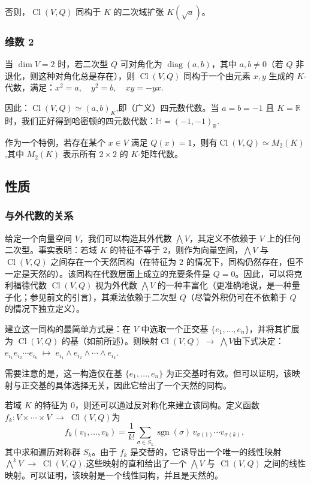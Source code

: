否则，$\operatorname{Cl}(V, Q)$ 同构于 $K$ 的二次域扩张 $K(\sqrt{a})$。
\subsubsection{维数 2}
当 $\dim V = 2$ 时，若二次型 $Q$ 可对角化为 $\operatorname{diag}(a, b)$，其中 $a, b \neq 0$（若 $Q$ 非退化，则这种对角化总是存在），则 $\operatorname{Cl}(V, Q)$ 同构于一个由元素 $x, y$ 生成的 $K$-代数，满足：$x^2 = a, \quad y^2 = b, \quad xy = - yx$.

因此：$\operatorname{Cl}(V, Q) \simeq (a, b)_K$,即（广义）四元数代数。当 $a = b = -1$ 且 $K = \mathbb{R}$ 时，我们正好得到哈密顿的四元数代数：$\mathbb{H} = (-1, -1)_{\mathbb{R}}$.

作为一个特例，若存在某个 $x \in V$ 满足 $Q(x) = 1$，则有$\operatorname{Cl}(V, Q) \simeq M_2(K)$,其中 $M_2(K)$ 表示所有 $2 \times 2$ 的 $K$-矩阵代数。
\subsection{性质}
\subsubsection{与外代数的关系}
给定一个向量空间 $V$，我们可以构造其外代数 $\bigwedge V$，其定义不依赖于 $V$ 上的任何二次型。事实表明：若域 $K$ 的特征不等于 2，则作为向量空间，$\bigwedge V$ 与 $\operatorname{Cl}(V, Q)$ 之间存在一个天然同构（在特征为 2 的情况下，同构仍然存在，但不一定是天然的）。该同构在代数层面上成立的充要条件是 $Q = 0$。因此，可以将克利福德代数 $\operatorname{Cl}(V, Q)$ 视为外代数 $\bigwedge V$ 的一种丰富化（更准确地说，是一种量子化；参见前文的引言），其乘法依赖于二次型 $Q$（尽管外积仍可在不依赖于 $Q$ 的情况下独立定义）。

建立这一同构的最简单方式是：在 $V$ 中选取一个正交基 $\{e_1, \ldots, e_n\}$，并将其扩展为 $\operatorname{Cl}(V, Q)$ 的基（如前所述）。则映射$\operatorname{Cl}(V, Q) \;\longrightarrow\; \bigwedge V$由下式决定：$e_{i_1} e_{i_2} \cdots e_{i_k} \;\mapsto\; e_{i_1} \wedge e_{i_2} \wedge \cdots \wedge e_{i_k}$.

需要注意的是，这一构造仅在基 $\{e_1, \ldots, e_n\}$ 为正交基时有效。但可以证明，该映射与正交基的具体选择无关，因此它给出了一个天然的同构。

若域 $K$ 的特征为 $0$，则还可以通过反对称化来建立该同构。定义函数$f_k : V \times \cdots \times V \;\longrightarrow\; \operatorname{Cl}(V, Q)$为
$$
f_k(v_1, \ldots, v_k) = \frac{1}{k!} \sum_{\sigma \in S_k} \operatorname{sgn}(\sigma)\, v_{\sigma(1)} \cdots v_{\sigma(k)},~
$$
其中求和遍历对称群 $S_k$。由于 $f_k$ 是交替的，它诱导出一个唯一的线性映射$\bigwedge\nolimits^k V \;\longrightarrow\; \operatorname{Cl}(V, Q)$.这些映射的直和给出了一个 $\bigwedge V$ 与 $\operatorname{Cl}(V, Q)$ 之间的线性映射。可以证明，该映射是一个线性同构，并且是天然的。

